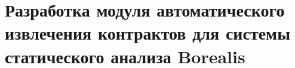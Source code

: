 \chapter{Разработка модуля автоматического извлечения контрактов для системы статического анализа Borealis}
